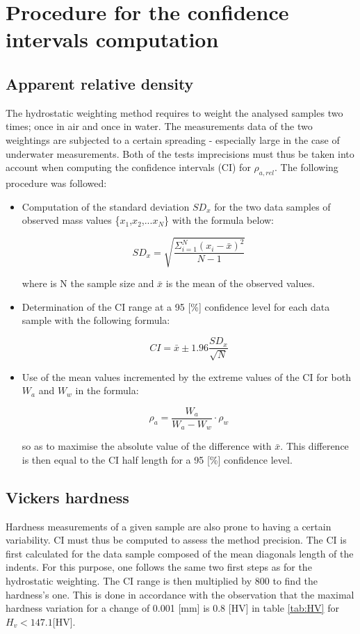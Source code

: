 
\chapter{Procedure for the confidence intervals computation} %

\label{AppendixC} %

\section{Apparent relative density}

The hydrostatic weighting method requires to weight the analysed samples two times; once in air and once in water. The measurements data of the two weightings are subjected to a certain spreading - especially large in the case of underwater measurements. Both of the tests imprecisions must thus be taken into account when computing the confidence intervals (CI) for $\rho_{a,rel}$. The following procedure was followed:

\begin{itemize}
\item Computation of the standard deviation $SD_x$ for the two data samples of observed mass values \{$x_1$,$x_2$,...$x_N$\} with the formula below:

$$SD_x=\sqrt{\frac{\Sigma^N_{i=1}(x_i-\bar{x})^2}{N-1}} $$

where is N the sample size and $\bar{x}$ is the mean of the observed values.

\item Determination of the CI range at a 95 [\%] confidence level for each data sample with the following formula:

$$CI= \bar{x} \pm 1.96 \frac{SD_x}{\sqrt{N}}$$

\item Use of the mean values incremented by the extreme values of the CI for both $W_a$ and $W_w$ in the formula:


$$\rho_a=\frac{W_a}{W_a-W_w} \cdot \rho_w $$

so as to maximise the absolute value of the difference with $\bar{x}$. This difference is then equal to the CI half length for a 95 [\%] confidence level.
\end{itemize}

\section{Vickers hardness}

Hardness measurements of a given sample are also prone to having a certain variability. CI must thus be computed to assess the method precision. The CI is first calculated for the data sample composed of the mean diagonals length of the indents. For this purpose, one follows the same two first steps as for the hydrostatic weighting. The CI range is then multiplied by 800 to find the hardness's one. This is done in accordance with the observation that the maximal hardness variation for a change of 0.001 [mm] is 0.8 [HV] in table \ref{tab:HV} for $H_v<147.1 $[HV].%